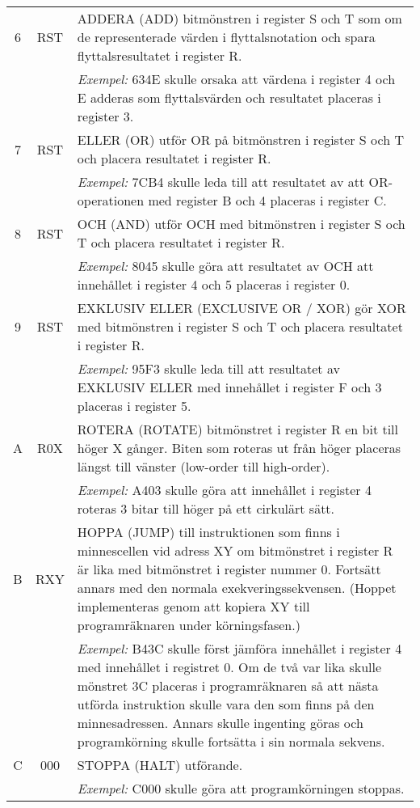 \begin{longtable}{|c|c|p{10cm}|}
\hline
6 & RST & ADDERA (ADD) bitmönstren i register S och T som om de representerade värden i flyttalsnotation och spara flyttalsresultatet i register R. \\
  &     & \textit{Exempel:} 634E skulle orsaka att värdena i register 4 och E adderas som flyttalsvärden och resultatet placeras i register 3. \\
\hline
7 & RST & ELLER (OR) utför OR på bitmönstren i register S och T och placera resultatet i register R. \\
  &     & \textit{Exempel:} 7CB4 skulle leda till att resultatet av att OR-operationen med register B och 4 placeras i register C. \\
\hline
8 & RST & OCH (AND) utför OCH med bitmönstren i register S och T och placera resultatet i register R. \\
  &     & \textit{Exempel:} 8045 skulle göra att resultatet av OCH att innehållet i register 4 och 5 placeras i register 0. \\
\hline
9 & RST & EXKLUSIV ELLER (EXCLUSIVE OR / XOR) gör XOR med bitmönstren i register S och T och placera resultatet i register R. \\
  &     & \textit{Exempel:} 95F3 skulle leda till att resultatet av EXKLUSIV ELLER med innehållet i register F och 3 placeras i register 5. \\
\hline
A & R0X & ROTERA (ROTATE) bitmönstret i register R en bit till höger X gånger. Biten som roteras ut från höger placeras längst till vänster (low-order till high-order). \\
  &     & \textit{Exempel:} A403 skulle göra att innehållet i register 4 roteras 3 bitar till höger på ett cirkulärt sätt. \\
\hline
B & RXY & HOPPA (JUMP) till instruktionen som finns i minnescellen vid adress XY om bitmönstret i register R är lika med bitmönstret i register nummer 0. Fortsätt annars med den normala exekveringssekvensen. (Hoppet implementeras genom att kopiera XY till programräknaren under körningsfasen.) \\
  &     & \textit{Exempel:} B43C skulle först jämföra innehållet i register 4 med innehållet i registret 0. Om de två var lika skulle mönstret 3C placeras i programräknaren så att nästa utförda instruktion skulle vara den som finns på den minnesadressen. Annars skulle ingenting göras och programkörning skulle fortsätta i sin normala sekvens. \\
\hline
C & 000 & STOPPA (HALT) utförande. \\
  &     & \textit{Exempel:} C000 skulle göra att programkörningen stoppas. \\
\hline
\end{longtable}
